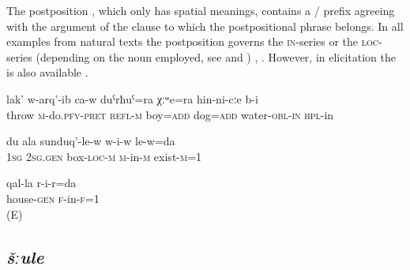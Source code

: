 The postposition , which only has spatial meanings, contains a / prefix agreeing with the  argument of the clause to which the postpositional phrase belongs. In all examples from natural texts the postposition governs the \textsc{in}-series or the \textsc{loc}-series (depending on the noun employed, see  and ) , . However, in elicitation the  is also available .
%
\begin{exe}
	\ex
	\begin{xlist}
		\ex	\label{(It) threw the boy and the dog into the water}
		\gll	lak'	w-arq'-ib	ca-w	duˁrħuˁ=ra	χːʷe=ra	hin-ni-cːe b-i  \\
			throw	\textsc{m}-do.\textsc{pfv}-\textsc{pret}	\textsc{refl}-\textsc{m}	boy=\textsc{add}	dog=\textsc{add} water-\textsc{obl}-\textsc{in} \textsc{hpl}-in\\
		\glt	{}

		\ex	\label{Iam inside your box}
		\gll	du	ala	sunduq'-le-w	w-i-w	le-w=da  \\
			1\textsc{sg}	2\textsc{sg}.\textsc{gen}	box-\textsc{loc}-\textsc{m}	\textsc{m}-in-\textsc{m}	exist-\textsc{m}=1\\
		\glt	{}

		\ex	\label{Iaminside the house}
		\gll	qal-la r-i-r=da  \\
			house-\textsc{gen} \textsc{f}-in-\textsc{f}=1\\
		\glt	{} (E)
	\end{xlist}
\end{exe}



\subsection{\textit{šːule} }
\label{ssec:postposition sule}

